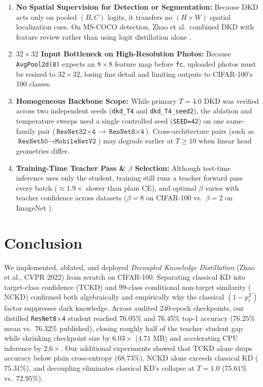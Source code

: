 \documentclass[11pt]{article}
\begin{document}
\begin{enumerate}
    \item \textbf{No Spatial Supervision for Detection or Segmentation:} Because DKD acts only on pooled \((B, C)\) logits, it transfers no \((H \times W)\) spatial localization cues. On MS-COCO detection, Zhao et al.\ combined DKD with feature review rather than using logit distillation alone \cite{zhao2022}.
    \item \textbf{\(32 \times 32\) Input Bottleneck on High-Resolution Photos:} Because \texttt{AvgPool2d(8)} expects an \(8 \times 8\) feature map before \texttt{fc}, uploaded photos must be resized to \(32 \times 32\), losing fine detail and limiting outputs to CIFAR-100's 100 classes.
    \item \textbf{Homogeneous Backbone Scope:} While primary \(T=4.0\) DKD was verified across two independent seeds (\texttt{dkd\_T4} and \texttt{dkd\_T4\_seed2}), the ablation and temperature sweeps used a single controlled seed (\texttt{SEED=42}) on one same-family pair (\(\texttt{ResNet32$\times$4} \to \texttt{ResNet8$\times$4}\)). Cross-architecture pairs (such as \(\texttt{ResNet50} \to \texttt{MobileNetV2}\)) may degrade earlier at \(T \ge 10\) when linear head geometries differ.
    \item \textbf{Training-Time Teacher Pass \& \(\beta\) Selection:} Although test-time inference uses only the student, training still runs a teacher forward pass every batch (\(\approx 1.9\times\) slower than plain CE), and optimal \(\beta\) varies with teacher confidence across datasets (\(\beta = 8\) on CIFAR-100 vs.\ \(\beta = 2\) on ImageNet \cite{zhao2022}).
\end{enumerate}

\section{Conclusion}
\label{sec:conclusion}

We implemented, ablated, and deployed \emph{Decoupled Knowledge Distillation} (Zhao et al., CVPR 2022) from scratch on CIFAR-100. Separating classical KD into target-class confidence (\(\mathrm{TCKD}\)) and 99-class conditional non-target similarity (\(\mathrm{NCKD}\)) confirmed both algebraically and empirically why the classical \((1 - p_t^T)\) factor suppresses dark knowledge. Across audited 240-epoch checkpoints, our distilled \texttt{ResNet8$\times$4} student reached \(76.05\%\) and \(76.45\%\) top-1 accuracy (\(76.25\%\) mean vs.\ \(76.32\%\) published), closing roughly half of the teacher--student gap while shrinking checkpoint size by \(6.03\times\) (\(4.71\text{ MB}\)) and accelerating CPU inference by \(2.6\times\). Our additional experiments showed that \(\mathrm{TCKD}\) alone drops accuracy below plain cross-entropy (\(68.73\%\)), \(\mathrm{NCKD}\) alone exceeds classical KD (\(75.31\%\)), and decoupling eliminates classical KD's collapse at \(T=1.0\) (\(75.61\%\) vs.\ \(72.95\%\)).
\end{document}

